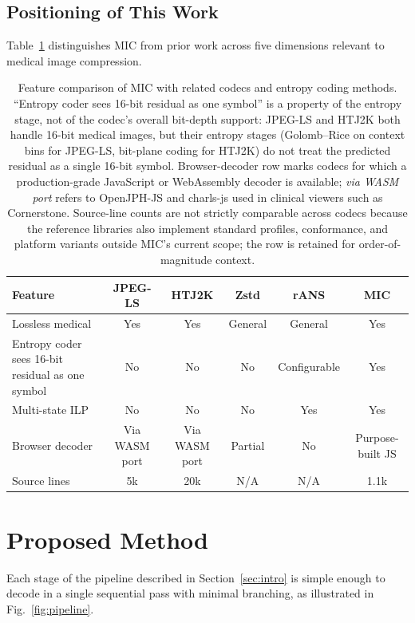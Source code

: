 \documentclass[journal]{IEEEtran}
\begin{document}
\subsection{Positioning of This Work}

Table~\ref{tab:positioning} distinguishes MIC from prior work across five
dimensions relevant to medical image compression.

\begin{table}[htbp]
\centering
\caption{Feature comparison of MIC with related codecs and entropy coding
methods. ``Entropy coder sees 16-bit residual as one symbol'' is a property
of the entropy stage, not of the codec's overall bit-depth support: JPEG-LS
and HTJ2K both handle 16-bit medical images, but their entropy stages
(Golomb--Rice on context bins for JPEG-LS, bit-plane coding for HTJ2K) do
not treat the predicted residual as a single 16-bit symbol. Browser-decoder
row marks codecs for which a production-grade JavaScript or WebAssembly
decoder is available; \emph{via WASM port} refers to OpenJPH-JS and
charls-js used in clinical viewers such as Cornerstone. Source-line counts
are not strictly comparable across codecs because the reference libraries
also implement standard profiles, conformance, and platform variants
outside MIC's current scope; the row is retained for order-of-magnitude
context.}
\label{tab:positioning}
\scriptsize
\setlength{\tabcolsep}{3pt}
\begin{tabular}{p{2.7cm}ccccc}
\toprule
Feature & JPEG-LS & HTJ2K & Zstd & rANS & MIC \\
\midrule
Lossless medical & Yes & Yes & General & General & Yes \\
Entropy coder sees 16-bit residual as one symbol & No & No & No & Configurable & Yes \\
Multi-state ILP & No & No & No & Yes & Yes \\
Browser decoder & Via WASM port & Via WASM port & Partial & No & Purpose-built JS \\
Source lines & 5k & 20k & N/A & N/A & 1.1k \\
\bottomrule
\end{tabular}
\end{table}

\section{Proposed Method}
\label{sec:pipeline}

Each stage of the pipeline described in Section~\ref{sec:intro} is simple
enough to decode in a single sequential pass with minimal branching, as
illustrated in Fig.~\ref{fig:pipeline}.
\end{document}
